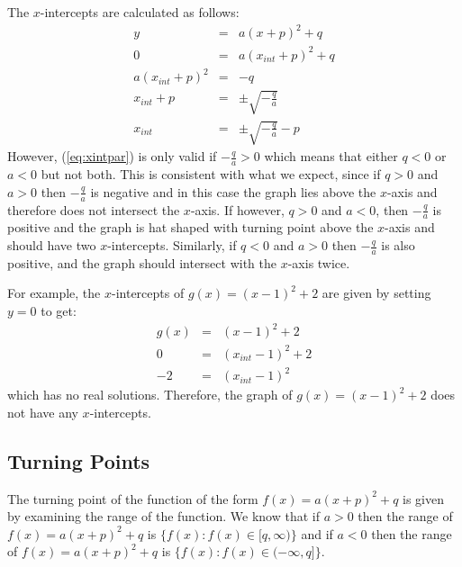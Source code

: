 The $x$-intercepts are calculated as follows:
\begin{eqnarray}
y&=&a(x+p)^2+q\\
0&=&a(x_{int}+p)^2+q\\
a(x_{int}+p)^2&=&-q\\
x_{int}+p&=&\pm \sqrt{-\frac{q}{a}}\\
\label{eq:xintpar}
x_{int}&=&\pm \sqrt{-\frac{q}{a}}-p
\end{eqnarray}
However, (\ref{eq:xintpar}) is only valid if $-\frac{q}{a}>0$ which means that either $q<0$ or $a<0$ but not both. This is consistent with what we expect, since if $q>0$ and $a>0$ then $-\frac{q}{a}$ is negative and in this case the graph lies above the $x$-axis and therefore does not intersect the $x$-axis. If however, $q>0$ and $a<0$, then $-\frac{q}{a}$ is positive and the graph is hat shaped with turning point above the $x$-axis and should have two $x$-intercepts. Similarly, if $q<0$ and $a>0$ then $-\frac{q}{a}$ is also positive, and the graph should intersect with the $x$-axis twice.

For example, the $x$-intercepts of $g(x)=(x-1)^2 + 2$ are given by setting $y=0$ to get:
\begin{eqnarray*}
g(x)&=&(x-1)^2 + 2\\
0&=&(x_{int}-1)^2 + 2\\
-2&=&(x_{int}-1)^2
\end{eqnarray*}
which has no real solutions. Therefore, the graph of $g(x)=(x-1)^2 + 2$ does not have any $x$-intercepts.


\subsection{Turning Points}
The turning point of the function of the form $f(x)=a(x+p)^2+q$ is given by examining the range of the function. We know that if $a>0$ then the range of $f(x)=a(x+p)^2+q$ is $\{f(x):f(x)\in[q,\infty)\}$ and if $a<0$ then the range of $f(x)=a(x+p)^2+q$ is $\{f(x):f(x)\in(-\infty,q]\}$.

